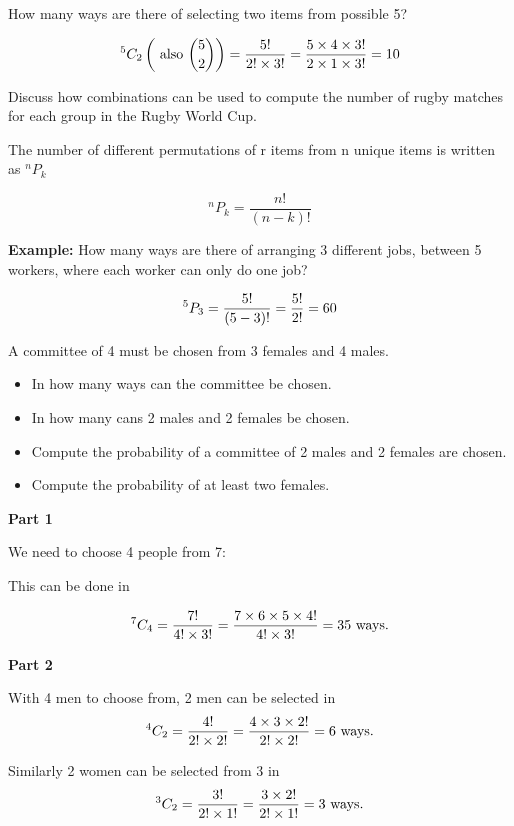 \documentclass[12pt]{report}
\begin{document}
	{\Large
		How many ways are there of selecting two items from possible 5?
		
		\[ ^5 C_2   \left( \mbox{ also }  {5 \choose 2}  \right) =  {5!  \over 2! \times 3!} =  {5 \times 4 \times 3!  \over 2 \times 1 \times 3!} = 10  \]
		
		\bigskip
		Discuss how combinations can be used to compute the number of rugby matches for each group in the Rugby World Cup.
		
	}
	{\Large
		The number of different permutations of r items from n unique items is written as $^n P_k$
		
		
		\[ ^n P_k = \frac{n!}{(n-k)!}\]
	}
	
	{\Large
		\textbf{Example:}
		How many ways are there of arranging 3 different jobs, between 5 workers, where each worker can only do one job?
		
		
		\[ ^5 P_3 = \frac{5!}{(5-3)!}  = {5! \over 2!} = 60\]
		
	}
	
	
	
	{\Large
		
		A committee of 4 must be chosen from 3 females and 4 males.
		
		\begin{itemize}
			\item In how many ways can the committee be chosen.
			\item In how many cans 2 males and 2 females be chosen.
			\item Compute the probability of a committee of 2 males and 2 females are chosen.
			\item Compute the probability of at least two females.
		\end{itemize}
	}
	
	{\Large
		
		\textbf{Part 1}
		
		We need to choose 4 people from 7:
		
		This can be done in
		
		\[
		^7 C_4  = {7!  \over 4! \times 3!} =  {7 \times 6 \times 5 \times 4!  \over 4! \times 3!} = 35 \mbox{ ways.}
		\]
		
		
		\textbf{Part 2}
		
		With 4 men to choose from, 2 men can be selected in \[
		^4 C_2  = {4!  \over 2! \times 2!} =  {4 \times 3 \times 2!  \over 2! \times 2!} = 6\mbox{ ways.}
		\]
		
		Similarly 2 women can be selected from 3 in
		\[
		^3 C_2  = {3!  \over 2! \times1!} =  {3 \times 2!  \over 2! \times 1!} = 3\mbox{ ways.}
		\]
		
	}
	
\end{document}
